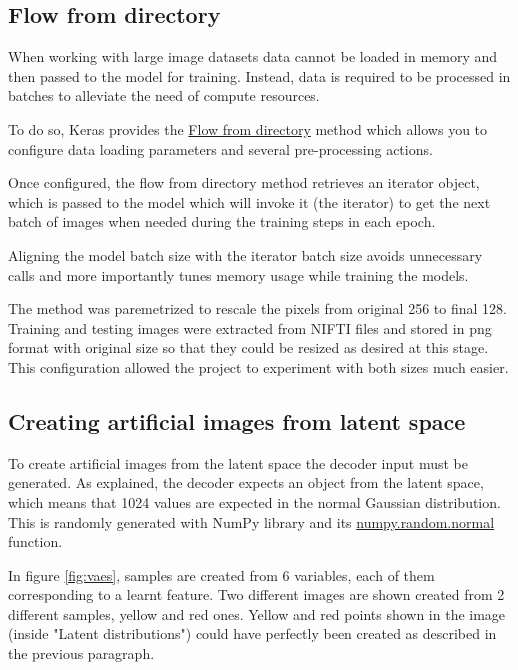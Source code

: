 \subsection{Flow from directory}

When working with large image datasets data cannot be loaded in memory and then passed to the model for training. Instead, data is required to be processed in batches to alleviate the need of compute resources.

To do so, Keras provides the \href{https://www.tensorflow.org/api_docs/python/tf/keras/preprocessing/image/ImageDataGenerator#flow_from_directory}{Flow from directory} method which allows you to configure data loading parameters and several pre-processing actions.

Once configured, the flow from directory method retrieves an iterator object, which is passed to the model which will invoke it (the iterator) to get the next batch of images when needed during the training steps in each epoch.

Aligning the model batch size with the iterator batch size avoids unnecessary calls and more importantly tunes memory usage while training the models.

The method was paremetrized to rescale the pixels from original 256 to final 128. Training and testing images were extracted from NIFTI files and stored in \acrshort{png} format with original size so that they could be resized as desired at this stage. This configuration allowed the project to experiment with both sizes much easier.

\subsection{Creating artificial images from latent space}
\label{sec:generate-images}
To create artificial images from the latent space the decoder input must be generated. As explained, the decoder expects an object from the latent space, which means that 1024 values are expected in the normal Gaussian distribution. This is randomly generated with NumPy library and its \href{https://numpy.org/doc/stable/reference/random/generated/numpy.random.normal.html}{numpy.random.normal} function.

In figure \ref{fig:vaes}, samples are created from 6 variables, each of them corresponding to a learnt feature. Two different images are shown created from 2 different samples, yellow and red ones. Yellow and red points shown in the image (inside "Latent distributions") could have perfectly been created as described in the previous paragraph.

